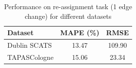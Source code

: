 \begin{table}[]
\centering
\caption{Performance on re-assignment task (1 edge change) for different datasets}
\label{reassign_table}
\begin{tabular}{lcc}
\toprule
Dataset & MAPE (\%) & RMSE \\
\midrule
Dublin SCATS\cite{dublin_scats} & 13.47 & 109.90 \\
TAPASCologne\cite{tapas} & 15.06 & 23.34 \\
\bottomrule
\end{tabular}
\end{table}